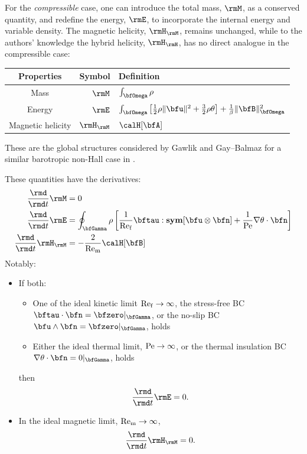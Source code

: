     For the \emph{compressible} case, one can introduce the total mass, $\rmM$, as a conserved quantity, and redefine the energy, $\rmE$, to incorporate the internal energy and variable density. The magnetic helicity, $\rmH_{\rmM}$, remains unchanged, while to the authors' knowledge the hybrid helicity, $\rmH_{\rmH}$, has no direct analogue in the compressible case:
    \begin{center}\begin{tabular}{ c | r : l }
        Properties  &  Symbol  &  Definition  \\
        \hline\hline
        Mass  &  $\rmM$  &  $\int_{\bfOmega}\rho$  \\
        Energy  &  $\rmE$  &  $\int_{\bfOmega}\left[\frac{1}{2}\rho\|\bfu\|^{2} + \frac{3}{2}\rho\theta\right] + \frac{1}{\beta}\|\bfB\|_{\bfOmega}^{2}$  \\
        \hdashline
        Magnetic helicity \cite{Blackman_2015}  &  $\rmH_{\rmM}$  &  $\calH[\bfA]$
    \end{tabular}\end{center}
    These are the global structures considered by Gawlik and Gay--Balmaz for a similar barotropic non-Hall case in \cite{Gawlik_Gay--Balmaz_2021}.

    These quantities have the derivatives:
    \begin{align}
        \frac{\rmd}{\rmd t}\rmM         &=  0  \\
        \frac{\rmd}{\rmd t}\rmE         &=  \oint_{\bfGamma}\rho\left[\frac{1}{\rmRef}\bftau:\sym[\bfu\otimes\bfn] + \frac{1}{\rmPe}\nabla\theta\cdot\bfn\right]  \\
        \frac{\rmd}{\rmd t}\rmH_{\rmM}  &=  - \frac{2}{\rmRem}\calH[\bfB]
    \end{align}
    Notably:
    \begin{itemize}
        \item  If both:
        \begin{itemize}
            \item  One of the ideal kinetic limit $\mathrm{Re}_{\mathrm{f}}  \rightarrow  \infty$, the stress-free BC $\bftau\cdot\bfn  =  \bfzero|_{\bfGamma}$, or the no-slip BC $\bfu\wedge\bfn  =  \bfzero|_{\bfGamma}$, holds
            \item  Either the ideal thermal limit, $\mathrm{Pe}  \rightarrow  \infty$, or the thermal insulation BC $\nabla\theta\cdot\bfn  =  0|_{\bfGamma}$, holds
        \end{itemize}
        then
        \begin{equation}
            \frac{\rmd}{\rmd t}\rmE  =  0.
        \end{equation}

        \item  In the ideal magnetic limit, $\mathrm{Re}_{\mathrm{m}}  \rightarrow  \infty$,
        \begin{equation}
            \frac{\rmd}{\rmd t}\rmH_{\rmM}  =  0.
        \end{equation}
      \end{itemize}

